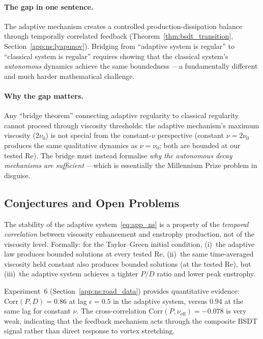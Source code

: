 \paragraph{The gap in one sentence.}
The adaptive mechanism creates a controlled
production-dissipation balance through temporally
correlated feedback (Theorem~\ref{thm:bsdt_transition},
Section~\ref{app:ns:lyapunov}).  Bridging from
``adaptive system is regular'' to ``classical system is
regular'' requires showing that the classical system's
\emph{autonomous} dynamics achieve the same boundedness
---a fundamentally different and much harder mathematical
challenge.

\paragraph{Why the gap matters.}
Any ``bridge theorem'' connecting adaptive regularity to
classical regularity cannot proceed through viscosity
thresholds: the adaptive mechanism's maximum viscosity
($2\nu_0$) is not special from the constant-$\nu$
perspective (constant $\nu = 2\nu_0$ produces the same
qualitative dynamics as $\nu = \nu_0$; both are bounded
at our tested Re).  The bridge must instead formalise
\emph{why the autonomous decay mechanisms are sufficient}
---which is essentially the Millennium Prize problem
in disguise.

\subsection{Conjectures and Open Problems}
\label{app:ns:conjectures}

\begin{conjecture}\label{conj:feedback_dynamics}
The stability of the adaptive system~\eqref{eq:app_ns} is a
property of the \emph{temporal correlation} between viscosity
enhancement and enstrophy production, not of the viscosity
level.  Formally: for the Taylor--Green initial condition,
(i)~the adaptive law produces bounded solutions at every
tested Re, (ii)~the same time-averaged viscosity held constant
also produces bounded solutions (at the tested Re), but
(iii)~the adaptive system achieves a tighter $P/D$ ratio
and lower peak enstrophy.

Experiment~6 (Section~\ref{app:ns:road_data}) provides
quantitative evidence: $\mathrm{Corr}(P,D) = 0.86$ at lag
$\epsilon = 0.5$ in the adaptive system, versus $0.94$ at
the same lag for constant $\nu$.  The cross-correlation
$\mathrm{Corr}(P, \nu_{\mathrm{eff}}) = -0.078$ is very
weak, indicating that the feedback mechanism acts through
the composite BSDT signal rather than direct response
to vortex stretching.
\end{conjecture}

